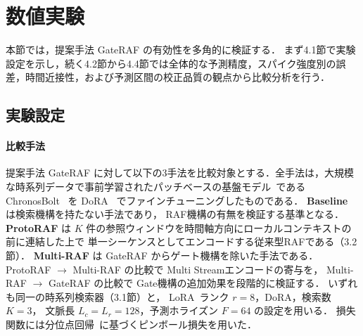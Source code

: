 \documentclass[twocolumn, lastpage]{jarticle}
\begin{document}
\section{数値実験}
本節では，提案手法 GateRAF の有効性を多角的に検証する．
まず4.1節で実験設定を示し，続く4.2節から4.4節では全体的な予測精度，スパイク強度別の誤差，時間近接性，および予測区間の校正品質の観点から比較分析を行う．


\subsection{実験設定}

    \paragraph{比較手法}
    提案手法 GateRAF に対して以下の3手法を比較対象とする．全手法は，大規模な時系列データで事前学習されたパッチベースの基盤モデル~\cite{Nie.2023}である ChronosBolt~\cite{Ansari.2024} を DoRA~\cite{Liu.2024} でファインチューニングしたものである．
    \textbf{Baseline} は検索機構を持たない手法であり，
    RAF機構の有無を検証する基準となる．
    \textbf{ProtoRAF} は $K$ 件の参照ウィンドウを時間軸方向にローカルコンテキストの前に連結した上で
    単一シーケンスとしてエンコードする従来型RAFである（3.2節）．
    \textbf{Multi-RAF} は GateRAF からゲート機構を除いた手法である．
    ProtoRAF $\to$ Multi-RAF の比較で Multi Streamエンコードの寄与を，
    Multi-RAF $\to$ GateRAF の比較で Gate機構の追加効果を段階的に検証する．
    いずれも同一の時系列検索器（3.1節）と，
    LoRA~\cite{Hu.2022}ランク $r=8$，DoRA，検索数 $K=3$，
    文脈長 $L_c = L_r = 128$，予測ホライズン $F=64$ の設定を用いる．
    損失関数には分位点回帰~\cite{Koenker.1978}に基づくピンボール損失を用いた．
\end{document}
